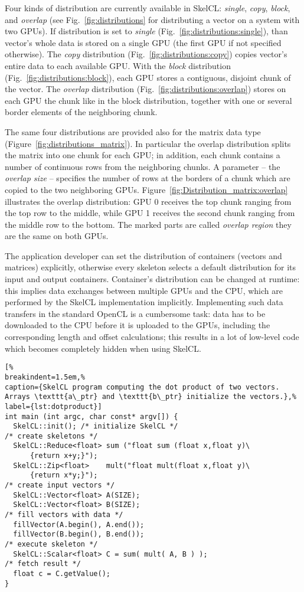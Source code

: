 Four kinds of distribution are currently available in SkelCL:
\emph{single}, \emph{copy}, \emph{block}, and \emph{overlap} (see Fig.~\ref{fig:distributions} for distributing a vector on a system with two GPUs).
If distribution is set to \emph{single} (Fig.~\ref{fig:distributions:single}), than vector's whole data is stored on a single GPU (the first GPU if not specified otherwise).
The \emph{copy} distribution (Fig.~\ref{fig:distributions:copy}) copies vector's entire data to each available GPU.
With the \emph{block} distribution (Fig.~\ref{fig:distributions:block}), each GPU stores a contiguous, disjoint chunk of the vector.
The \emph{overlap} distribution (Fig.~\ref{fig:distributions:overlap}) stores on each GPU the chunk like in the block distribution, together with one or several border elements of the neighboring chunk.

The same four distributions are provided also for the matrix data type (Figure~\ref{fig:distributions_matrix}). In particular the overlap distribution splits the matrix into one chunk for each GPU;
in addition, each chunk contains a number of continuous rows from the neighboring chunks.
A parameter -- the \emph{overlap size} -- specifies the number of rows at the borders of a chunk which are copied to the two neighboring GPUs.
Figure~\ref{fig:Distribution_matrix:overlap} illustrates the overlap distribution:
GPU 0 receives the top chunk ranging from the top row to the middle, while GPU 1 receives the second chunk ranging from the middle row to the bottom.
The marked parts are called \emph{overlap region} they are the same on both GPUs.

The application developer can set the distribution of containers (vectors and matrices) explicitly, otherwise every skeleton selects a default distribution for its input and output containers.
Container's distribution can be changed at runtime:
this implies data exchanges between multiple GPUs and the CPU, which are performed by the SkelCL implementation implicitly.
Implementing such data transfers in the standard OpenCL is a cumbersome task:
data has to be downloaded to the CPU before it is uploaded to the GPUs, including the corresponding length and offset calculations;
this results in a lot of low-level code which becomes completely hidden when using SkelCL.

\begin{lstlisting}[%
breakindent=1.5em,%
caption={SkelCL program computing the dot product of two vectors. Arrays \texttt{a\_ptr} and \texttt{b\_ptr} initialize the vectors.},%
label={lst:dotproduct}]
int main (int argc, char const* argv[]) {
  SkelCL::init(); /* initialize SkelCL */
/* create skeletons */
  SkelCL::Reduce<float> sum ("float sum (float x,float y)\
      {return x+y;}");
  SkelCL::Zip<float>    mult("float mult(float x,float y)\
      {return x*y;}");
/* create input vectors */
  SkelCL::Vector<float> A(SIZE);
  SkelCL::Vector<float> B(SIZE);
/* fill vectors with data */
  fillVector(A.begin(), A.end());
  fillVector(B.begin(), B.end());
/* execute skeleton */
  SkelCL::Scalar<float> C = sum( mult( A, B ) );
/* fetch result */
  float c = C.getValue();
}
\end{lstlisting}


